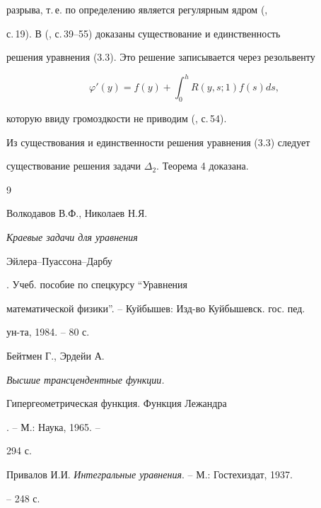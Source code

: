 разрыва, т.\,е. по определению является регулярным ядром (\cite{3}, 


с.\,19). В (\cite{3}, с.\,39--55) доказаны существование и единственность 


решения уравнения (3.3). Это решение записывается через резольвенту 


$$ 


\varphi'(y)=f(y)+\int^h_0 R(y,s;1)f(s)d s, 


$$ 


которую ввиду громоздкости не приводим (\cite{3}, с.\,54). 


 


Из существования и единственности решения уравнения (3.3) следует 


существование решения задачи $\Delta_2$. Теорема 4 доказана. 


 


 


\begin{thebibliography}{9} 


 




Волкодавов В.Ф., Николаев Н.Я. {\em Краевые задачи для уравнения 


Эйлера--Пуассона--Дарбу}. Учеб. пособие по спецкурсу ``Уравнения 


математической физики''. -- Куйбышев: Изд-во Куйбышевск. гос. пед. 


ун-та, 1984. -- 80 с. 




Бейтмен Г., Эрдейи А. {\em Высшие трансцендентные функции. 


Гипергеометрическая функция. Функция Лежандра}. -- М.: Наука, 1965. -- 


294 с. 




Привалов И.И. {\em Интегральные уравнения}. -- М.: Гостехиздат, 1937. 


-- 248 с. 


 


 


\end{thebibliography} 


 


\vskip 2cm 


 






 


\label{end} 


 


